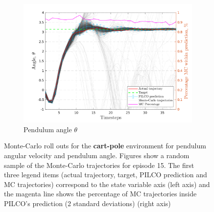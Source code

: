 \begin{figure}[htp!]
  \begin{subfigure}[b]{1\linewidth}
    \centering
    \includegraphics[height=0.4\textheight,width=1\textwidth]{Chapter3/Figures/cp_MC_rollout_Ep_15_Dim_4.png} 
    \caption{Pendulum angle $\theta$} 
    \label{Fig:Re-cp-pen-angle} 
  \end{subfigure} 
\caption[Monte-Carlo roll outs for \textbf{cart-pole} pendulum angular velocity and pendulum angle]{Monte-Carlo roll outs for the \textbf{cart-pole} environment for pendulum angular velocity and pendulum angle. Figures show a random sample of the Monte-Carlo trajectories for episode 15. The first three legend items (actual trajectory, target, PILCO prediction and MC trajectories) correspond to the state variable axis (left axis) and the magenta line shows the percentage of MC trajectories inside PILCO's prediction (2 standard deviations) (right axis)}
\label{Re:cp-MC-roll-outs-2} 
\end{figure}
 
